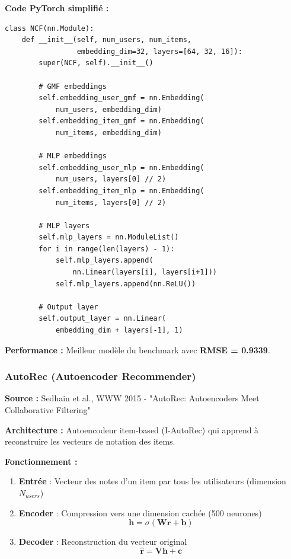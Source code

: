 \documentclass[12pt,a4paper]{article}
\begin{document}
\textbf{Code PyTorch simplifié :}
\begin{lstlisting}[style=pythonstyle, caption=Architecture NCF (extrait)]
class NCF(nn.Module):
    def __init__(self, num_users, num_items, 
                 embedding_dim=32, layers=[64, 32, 16]):
        super(NCF, self).__init__()
        
        # GMF embeddings
        self.embedding_user_gmf = nn.Embedding(
            num_users, embedding_dim)
        self.embedding_item_gmf = nn.Embedding(
            num_items, embedding_dim)
        
        # MLP embeddings
        self.embedding_user_mlp = nn.Embedding(
            num_users, layers[0] // 2)
        self.embedding_item_mlp = nn.Embedding(
            num_items, layers[0] // 2)
        
        # MLP layers
        self.mlp_layers = nn.ModuleList()
        for i in range(len(layers) - 1):
            self.mlp_layers.append(
                nn.Linear(layers[i], layers[i+1]))
            self.mlp_layers.append(nn.ReLU())
        
        # Output layer
        self.output_layer = nn.Linear(
            embedding_dim + layers[-1], 1)
\end{lstlisting}

\textbf{Performance :} Meilleur modèle du benchmark avec \textbf{RMSE = 0.9339}.

\subsubsection{AutoRec (Autoencoder Recommender)}

\textbf{Source :} Sedhain et al., WWW 2015 - "AutoRec: Autoencoders Meet Collaborative Filtering"

\textbf{Architecture :} Autoencodeur item-based (I-AutoRec) qui apprend à reconstruire les vecteurs de notation des items.

\textbf{Fonctionnement :}

\begin{enumerate}
    \item \textbf{Entrée} : Vecteur des notes d'un item par tous les utilisateurs (dimension $N_{users}$)
    \item \textbf{Encoder} : Compression vers une dimension cachée (500 neurones)
    \begin{equation}
        \mathbf{h} = \sigma(\mathbf{W} \mathbf{r} + \mathbf{b})
    \end{equation}
    \item \textbf{Decoder} : Reconstruction du vecteur original
    \begin{equation}
        \hat{\mathbf{r}} = \mathbf{V} \mathbf{h} + \mathbf{c}
    \end{equation}
\end{enumerate}
\end{document}
